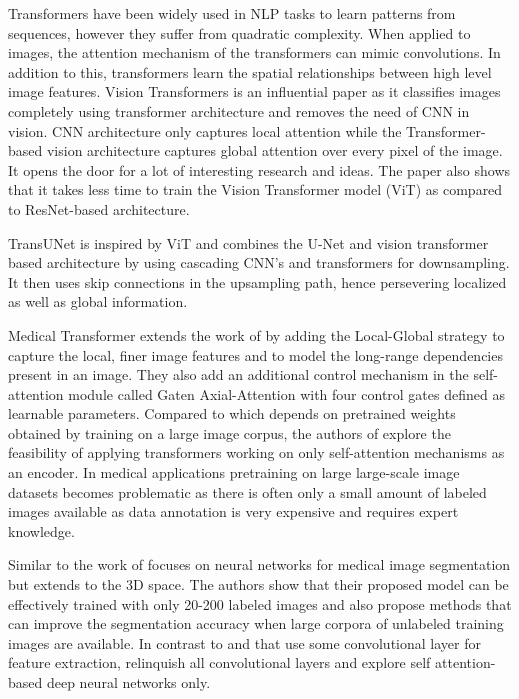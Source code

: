 \par
Transformers have been widely used in NLP tasks to learn patterns from sequences, however they suffer from quadratic complexity. When applied to images, the attention mechanism of the transformers can mimic convolutions. In addition to this, transformers learn the spatial relationships between high level image features. Vision Transformers \citep{transformers-2020-dosovitskiy} is an influential paper as it classifies images completely using transformer architecture and removes the need of CNN in vision. CNN architecture only captures local attention while the Transformer-based vision architecture captures global attention over every pixel of the image.  It opens the door for a lot of interesting research and ideas. The paper also shows that it takes less time to train the Vision Transformer model (ViT) as compared to ResNet-based architecture.

\par
TransUNet \citep{transunet-2021-chen} is inspired by ViT \citep{transformers-2020-dosovitskiy} and combines the U-Net and vision transformer based architecture by using cascading CNN’s and transformers for downsampling. It then uses skip connections in the upsampling path, hence persevering localized as well as global information.

\par
Medical Transformer \citep{medical_transformer-2021-valanarasu} extends the work of \citep{transformers-2020-dosovitskiy} by adding the Local-Global strategy to capture the local, finer image features and to model the long-range  dependencies present in an image. They also add an additional control mechanism in the self-attention module called Gaten Axial-Attention with four control gates defined as learnable parameters. Compared to \citep{transunet-2021-chen} which depends on pretrained weights obtained by training on a large image corpus, the authors of \citep{medical_transformer-2021-valanarasu} explore the feasibility of applying transformers working on only self-attention mechanisms as an encoder. In medical applications pretraining on large large-scale image datasets becomes problematic as there is often only a small amount of labeled images available as data annotation is very expensive and requires expert knowledge.

\par
Similar to \citep{medical_transformer-2021-valanarasu} the work of \citep{convolution_free-2021-karimi} focuses on neural networks for medical image segmentation but extends to the 3D space. The authors show that their proposed model can be effectively trained with only 20-200 labeled images and also propose methods that can improve the segmentation accuracy when large corpora of unlabeled training images are available. In contrast to \citep{medical_transformer-2021-valanarasu} and \citep{transformers-2020-dosovitskiy} that use some convolutional layer for feature extraction, \citep{convolution_free-2021-karimi} relinquish all convolutional layers and explore self attention-based deep neural networks only.


